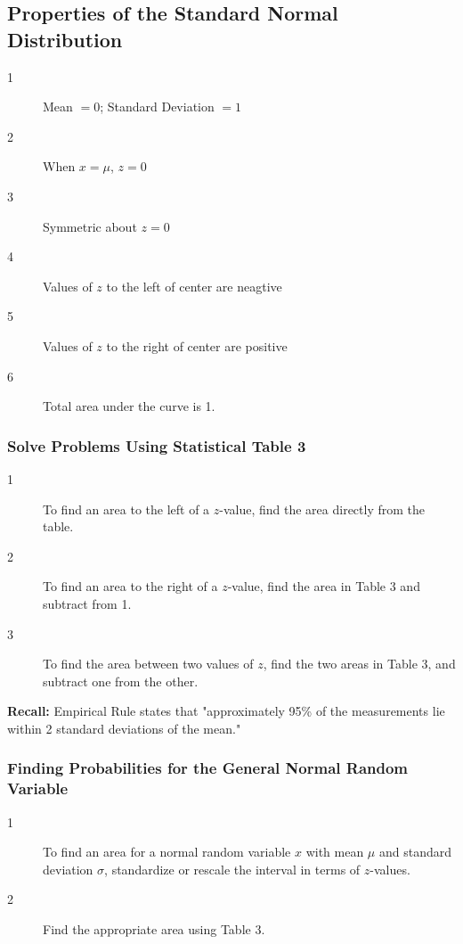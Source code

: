 \documentclass[12pt, letterpaper]{article}
\begin{document}
            \subsection*{Properties of the Standard Normal Distribution}
            \begin{description}
                \item[1] Mean $= 0$; Standard Deviation $= 1$
                \item[2] When $x = \mu$, $z = 0$
                \item[3] Symmetric about $z = 0$
                \item[4] Values of $z$ to the left of center are neagtive
                \item[5] Values of $z$ to the right of center are positive
                \item[6] Total area under the curve is 1.
            \end{description}
            \subsubsection{Solve Problems Using Statistical Table 3}
                \begin{description}
                    \item[1] To find an area to the left of a $z$-value, find the area directly from the table.
                    \item[2] To find an area to the right of a $z$-value, find the area in Table 3 and subtract from 1.
                    \item[3] To find the area between two values of $z$, find the two areas in Table 3, and subtract one from the other.
                \end{description}
                \textbf{Recall:} Empirical Rule states that "approximately 95\% of the measurements lie within 2 standard deviations of the mean."
            
            \subsubsection{Finding Probabilities for the General Normal Random Variable}
                \begin{description}
                    \item[1] To find an area for a normal random variable $x$ with mean $\mu$ and standard deviation $\sigma$, standardize or rescale the interval in terms of $z$-values.
                    \item[2] Find the appropriate area using Table 3.
                \end{description}
\end{document}
